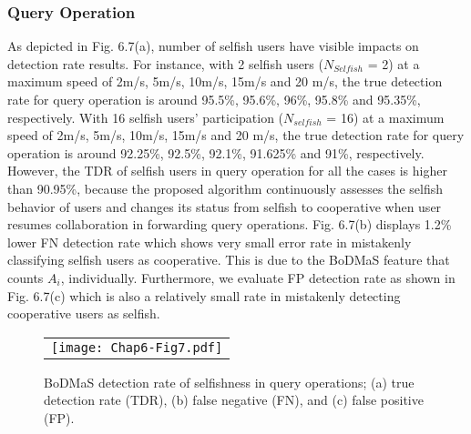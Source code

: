 \subsubsection{Query Operation}\label{Chap6_05_02_01}
As depicted in Fig. 6.7(a), number of selfish users have visible impacts on detection rate results. For instance,  with 2 selfish users ($N_{Selfish}$ = 2) at a maximum speed of 2m/s, 5m/s, 10m/s, 15m/s and 20 m/s, the true detection rate for query operation is around 95.5\%, 95.6\%, 96\%, 95.8\% and 95.35\%, respectively. With 16 selfish users' participation ($N_{selfish}$ = 16) at a maximum speed of 2m/s, 5m/s, 10m/s, 15m/s and 20 m/s, the true detection rate for query operation is around 92.25\%, 92.5\%, 92.1\%, 91.625\% and 91\%, respectively. However, the TDR of selfish users in query operation for all the cases is higher than 90.95\%, because the proposed algorithm continuously assesses the selfish behavior of users and changes its status from selfish to cooperative when user resumes collaboration in forwarding query operations. Fig. 6.7(b) displays 1.2\% lower FN detection rate which shows very small error rate in mistakenly classifying selfish users as cooperative. This is due to the BoDMaS feature that counts $A_i$, individually. Furthermore, we evaluate FP detection rate as shown in Fig. 6.7(c) which is also a relatively small rate in mistakenly detecting cooperative users as selfish.
\begin{figure}[t]
\begin{center}
  \begin{tabular}{c}
  \texttt{[image: Chap6-Fig7.pdf]}
  \end{tabular}
  \caption{BoDMaS detection rate of selfishness in query operations; (a) true detection rate (TDR), (b) false negative (FN), and (c) false positive (FP).}
\end{center}
\end{figure}

